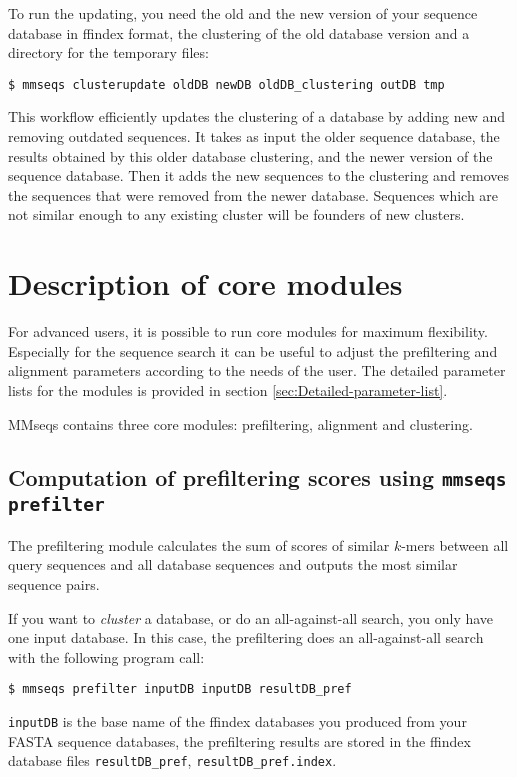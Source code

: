 \documentclass[11pt,a4paper]{report}
\begin{document}
To run the updating, you need the old and the new version of your
sequence database in ffindex format, the clustering of the old database
version and a directory for the temporary files:

\texttt{\$ mmseqs clusterupdate oldDB newDB oldDB\_clustering outDB tmp}

This workflow efficiently updates the clustering of a database by
adding new and removing outdated sequences. It takes as input the
older sequence database, the results obtained by this older database
clustering, and the newer version of the sequence database. Then it
adds the new sequences to the clustering and removes the sequences
that were removed from the newer database. Sequences which are not
similar enough to any existing cluster will be founders of new clusters.


\section{Description of core modules}

For advanced users, it is possible to run core modules for maximum
flexibility. Especially for the sequence search it can be useful to
adjust the prefiltering and alignment parameters according to the
needs of the user. The detailed parameter lists for the modules is
provided in section \ref{sec:Detailed-parameter-list}.

MMseqs contains\textbf{ }three core modules: prefiltering, alignment
and clustering.


\subsection{Computation of prefiltering scores using \texttt{mmseqs prefilter}\label{sub:Prefiltering}}

The prefiltering module calculates the sum of scores of similar $k$-mers
between all query sequences and all database sequences and outputs
the most similar sequence pairs. 

If you want to \emph{cluster} a database, or do an all-against-all
search, you only have one input database. In this case, the prefiltering
does an all-against-all search with the following program call:

\texttt{\$ mmseqs prefilter inputDB inputDB resultDB\_pref }

\texttt{inputDB} is the base name of the ffindex databases you produced
from your FASTA sequence databases, the prefiltering results are stored
in the ffindex database files \texttt{resultDB\_pref}, \texttt{resultDB\_pref.index}.
\end{document}
